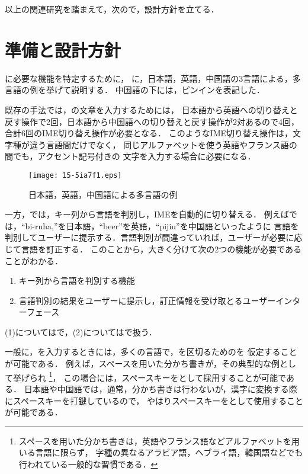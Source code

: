 \documentclass[japanese]{jnlp_1.4}
\newcommand{\name}{}
\newcommand{\secref}[1]{}
\newcommand{\figref}[1]{}
\renewcommand{\text}{}
\newcommand{\delim}{}
\begin{document}
以上の関連研究を踏まえて，次の\secref{sec:premodel}で，設計方針を立てる．


\section{準備と設計方針}
\label{sec:premodel}

{\name}に必要な機能を特定するために，
\figref{fig:toyota}に，日本語，英語，中国語の3言語による，多言語{\text}の例を挙げて説明する．
中国語の下には，ピンインを表記した．

既存の手法では，\figref{fig:toyota}の文章を入力するためには，
日本語から英語への切り替えと戻す操作で2回，日本語から中国語への切り替えと戻す操作が2対あるので4回，
合計6回のIME切り替え操作が必要となる．
このようなIME切り替え操作は，文字種が違う言語間だけでなく，
同じアルファベットを使う英語やフランス語の間でも，アクセント記号付きの
文字を入力する場合に必要になる．

\begin{figure}[t]
\begin{center} 
\texttt{[image: 15-5ia7f1.eps]}
\caption{日本語，英語，中国語による多言語{\text}の例} 
\label{fig:toyota} 
\end{center} 
\end{figure}

一方，{\name}では，キー列から言語を判別し，IMEを自動的に切り替える．
例えば\figref{fig:toyota}では，``bi-ruha,''を日本語，``beer''を英語，``pijiu''を中国語といったように
言語を判別してユーザーに提示する．言語判別が間違っていれば，ユーザーが必要に応じて言語を訂正する．
このことから，大きく分けて次の2つの機能が必要であることがわかる．
\begin{enumerate}
\item キー列から言語を判別する機能
\item 言語判別の結果をユーザーに提示し，訂正情報を受け取とるユーザーインターフェース
\end{enumerate}

(1)については\secref{sec:model}で，(2)については\secref{sec:design}で扱う．

一般に，{\text}を入力するときには，多くの言語で，{\text}を区切るための{\delim}を
仮定することが可能である．
例えば，スペースを用いた分かち書きが，その典型的な例として挙げられ
\footnote{スペースを用いた分かち書きは，英語やフランス語などアルファベットを用いる言語に限らず，
字種の異なるアラビア語，ヘブライ語，韓国語などでも行われている一般的な習慣である．}，
この場合には，スペースキーを{\delim}として採用することが可能である．
日本語や中国語では，通常，分かち書きは行わないが，漢字に変換する際にスペースキーを打鍵しているので，
やはりスペースキーを{\delim}として使用することが可能である．
\end{document}

